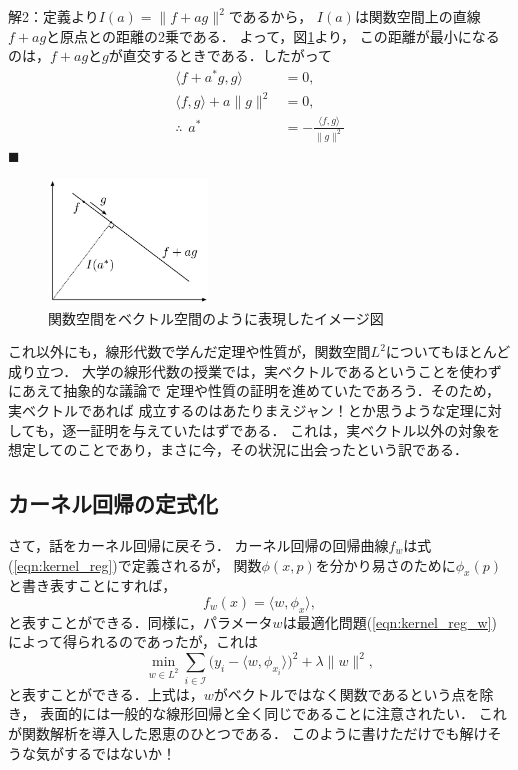 \noindent\textsf{解2}：定義より$I(a) = \| f + a g \|^2$であるから，
$I(a)$は関数空間上の直線$f + a g$と原点との距離の2乗である．
よって，図\ref{fig:functional_example_sol2}より，
この距離が最小になるのは，$f + a g$と$g$が直交するときである．したがって
\begin{align*}
\langle f + a^* g, g \rangle &= 0, \\
\langle f, g \rangle + a \| g \|^2 &= 0, \\
\therefore \hspace{5pt} a^* &= - \frac{\langle f, g \rangle}{\| g \|^2}
\end{align*}
\hfill$\blacksquare$

\begin{figure}[t]
\centerline{\includegraphics[clip,width=120pt]{figures/functional_example_sol2.pdf}}
\caption{関数空間をベクトル空間のように表現したイメージ図}
\label{fig:functional_example_sol2}
\end{figure}

これ以外にも，線形代数で学んだ定理や性質が，関数空間$L^2$についてもほとんど成り立つ．
大学の線形代数の授業では，実ベクトルであるということを使わずにあえて抽象的な議論で
定理や性質の証明を進めていたであろう．そのため，実ベクトルであれば
成立するのはあたりまえジャン！とか思うような定理に対しても，逐一証明を与えていたはずである．
これは，実ベクトル以外の対象を想定してのことであり，まさに今，その状況に出会ったという訳である．


\subsection{カーネル回帰の定式化}

さて，話をカーネル回帰に戻そう．
カーネル回帰の回帰曲線$f_w$は式(\ref{eqn:kernel_reg})で定義されるが，
関数$\phi(x, p)$を分かり易さのために$\phi_x(p)$と書き表すことにすれば，
\begin{equation}
f_w(x) = \langle w, \phi_x \rangle,
\end{equation}
と表すことができる．同様に，パラメータ$w$は最適化問題(\ref{eqn:kernel_reg_w})
によって得られるのであったが，これは
\begin{equation}
\label{eqn:kernel_reg_w_fp}
\min_{w \in L^2} \sum_{i \in \mathcal{I}} \bigl( y_i - \langle w, \phi_{x_i} \rangle \bigr)^2
+ \lambda \| w \|^2,
\end{equation}
と表すことができる．上式は，$w$がベクトルではなく関数であるという点を除き，
表面的には一般的な線形回帰と全く同じであることに注意されたい．
これが関数解析を導入した恩恵のひとつである．
このように書けただけでも解けそうな気がするではないか！

